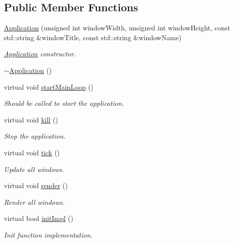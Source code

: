 \subsection*{Public Member Functions}
\begin{DoxyCompactItemize}
\item 
\mbox{\hyperlink{classec_1_1_application_af4a94888105d739a2de75be17ce9ad67}{Application}} (unsigned int window\+Width, unsigned int window\+Height, const std\+::string \&window\+Title, const std\+::string \&window\+Name)
\begin{DoxyCompactList}\small\item\em \mbox{\hyperlink{classec_1_1_application}{Application}} constructor. \end{DoxyCompactList}\item 
\mbox{\hyperlink{classec_1_1_application_abe00fd469062e9710bfda9f9d13765f3}{$\sim$\+Application}} ()
\item 
virtual void \mbox{\hyperlink{classec_1_1_application_ad541044a8fc0ff8d6c3fc57220109a50}{start\+Main\+Loop}} ()
\begin{DoxyCompactList}\small\item\em Should be called to start the application. \end{DoxyCompactList}\item 
virtual void \mbox{\hyperlink{classec_1_1_application_a2a4c494f47bc187ddc2bb5411aa063a3}{kill}} ()
\begin{DoxyCompactList}\small\item\em Stop the application. \end{DoxyCompactList}\item 
virtual void \mbox{\hyperlink{classec_1_1_application_a036ae53bcbf708c7a01deb199feeccdf}{tick}} ()
\begin{DoxyCompactList}\small\item\em Update all windows. \end{DoxyCompactList}\item 
virtual void \mbox{\hyperlink{classec_1_1_application_a4fe5dcd06017ba4322eca3adec47e03e}{render}} ()
\begin{DoxyCompactList}\small\item\em Render all windows. \end{DoxyCompactList}\item 
virtual bool \mbox{\hyperlink{classec_1_1_application_a1460d7083c312271285747a7cc03f7e8}{init\+Impl}} ()
\begin{DoxyCompactList}\small\item\em Init function implementation. \end{DoxyCompactList}\item 

\end{DoxyCompactItemize}
